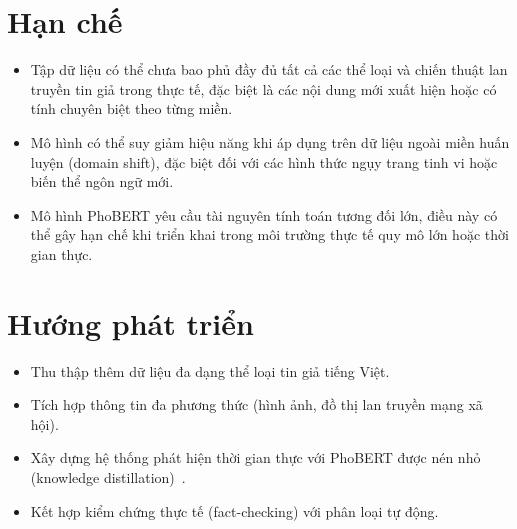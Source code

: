\documentclass[12pt, a4paper]{report}
\begin{document}
\section*{Hạn chế}

\begin{itemize}[leftmargin=2em]
  \item Tập dữ liệu có thể chưa bao phủ đầy đủ tất cả các thể loại và chiến thuật lan truyền tin giả trong thực tế, đặc biệt là các nội dung mới xuất hiện hoặc có tính chuyên biệt theo từng miền.
  
  \item Mô hình có thể suy giảm hiệu năng khi áp dụng trên dữ liệu ngoài miền huấn luyện (domain shift), đặc biệt đối với các hình thức ngụy trang tinh vi hoặc biến thể ngôn ngữ mới.
  
  \item Mô hình PhoBERT yêu cầu tài nguyên tính toán tương đối lớn, điều này có thể gây hạn chế khi triển khai trong môi trường thực tế quy mô lớn hoặc thời gian thực.
\end{itemize}
\section*{Hướng phát triển}

\begin{itemize}[leftmargin=2em]
  \item Thu thập thêm dữ liệu đa dạng thể loại tin giả tiếng Việt.
  \item Tích hợp thông tin đa phương thức (hình ảnh, đồ thị lan truyền mạng xã hội).
  \item Xây dựng hệ thống phát hiện thời gian thực với PhoBERT được nén nhỏ (knowledge distillation)~\cite{hinton2015distilling}.
  \item Kết hợp kiểm chứng thực tế (fact-checking) với phân loại tự động.
\end{itemize}



\end{document}
